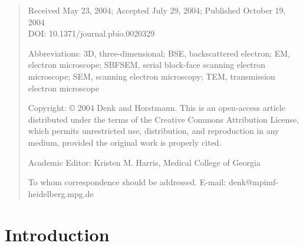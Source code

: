 \documentclass{article}
\begin{document}

\begin{quote}\small
\noindent Received May 23, 2004; Accepted July 29, 2004; Published October 19, 2004\\
DOI: 10.1371/journal.pbio.0020329

\noindent Abbreviations: 3D, three-dimensional; BSE, backscattered electron; EM, electron microscope; SBFSEM, serial block-face scanning electron microscope; SEM, scanning electron microscopy; TEM, transmission electron microscope

\noindent Copyright: © 2004 Denk and Horstmann. This is an open-access article distributed under the terms of the Creative Commons Attribution License, which permits unrestricted use, distribution, and reproduction in any medium, provided the original work is properly cited.

\noindent Academic Editor: Kristen M. Harris, Medical College of Georgia

\noindent *To whom correspondence should be addressed. E-mail: denk@mpimf-heidelberg.mpg.de
\end{quote}

\section*{Introduction}
\end{document}
